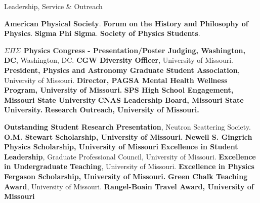 \begin{rubric}{Leadership, Service \& Outreach}

\entry*[2019--Present] \textbf{American Physical Society}.
\entry*[2020--Present] \textbf{Forum on the History and Philosophy of Physics}.
\entry*[2022--Present] \textbf{Sigma Phi Sigma}.
\entry*[2017--2021] \textbf{Society of Physics Students}.

\entry*[2022] \textbf{$\Sigma \Pi \Sigma$ Physics Congress - Presentation/Poster Judging, Washington, DC}, Washington, DC.
\entry*[2022--Present] \textbf{CGW Diversity Officer}, University of Missouri.
\entry*[2022--Present] \textbf{President, Physics and Astronomy Graduate Student Association}, University of Missouri.
\entry*[2022-2024] \textbf{Director, PAGSA Mental Health Wellness Program, University of Missouri.}
\entry*[2017-2020] \textbf{SPS High School Engagement, Missouri State University}
\entry*[2018-2019] \textbf{CNAS Leadership Board, Missouri State University.}
\entry*[2022-2024] \textbf{ Research Outreach, University of Missouri.}

\entry*[2023] \textbf{Outstanding Student Research Presentation}, Neutron Scattering Society.
\entry*[2021] \textbf{O.M. Stewart Scholarship, University of Missouri.}
\entry*[2022] \textbf{Newell S. Gingrich Physics Scholarship, University of Missouri}
\entry*[2022] \textbf{Excellence in Student Leadership}, Graduate Professional Council, University of Missouri.
\entry*[2022] \textbf{Excellence in Undergraduate Teaching}, University of Missouri.
\entry*[2023] \textbf{Excellence in Physics Fergason Scholarship, University of Missouri.}
\entry*[2023] \textbf{Green Chalk Teaching Award}, University of Missouri.
\entry*[2023] \textbf{Rangel-Boain Travel Award, University of Missouri}

\end{rubric}



